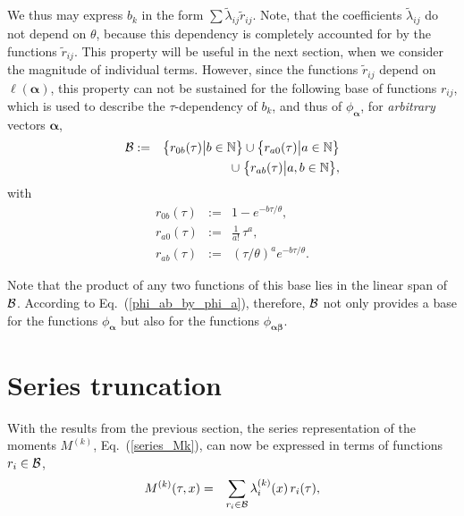 \documentclass[aps,twocolumn,superscriptaddress,showpacs,showkeys]{revtex4}
\newcommand{\vecalpha}{{\boldsymbol{\alpha}}}
\newcommand{\vecbeta}{{\boldsymbol{\beta}}}
\begin{document}
\noindent We thus may express $b_k$ in the form $\sum\tilde \lambda_{ij}\tilde r_{ij}$. Note, that the coefficients
$\tilde \lambda_{ij}$ do not depend on $\theta$, because this dependency is completely accounted for
by the functions $\tilde r_{ij}$. This property will be useful in the next section, when we consider the magnitude of
individual terms.
However, since the functions $\tilde r_{ij}$ depend on $\ell(\vecalpha)$, this property can not be sustained for
the following base of functions $r_{ij}$, which is used to describe the $\tau$-dependency of $b_k$, and thus of
$\phi_\vecalpha$, for {\em arbitrary} vectors $\vecalpha$,
%
\begin{eqnarray}
{\cal B} &:=& \big\{r_{0b}(\tau)\big|b\in\mathbb{N}\big\}\cup
              \big\{r_{a0}(\tau)\big|a\in\mathbb{N}\big\}\cr
         && \cup\; \big\{r_{ab}(\tau)\big|a,b\in\mathbb{N}\big\},
\end{eqnarray}
\noindent with
%
\begin{subequations}\label{def_r_ab}
\begin{eqnarray}
r_{0b}(\tau) &:=& 1-e^{-b\tau/\theta},\\
r_{a0}(\tau) &:=& \frac{1}{a!}\,\tau^a,\\
r_{ab}(\tau) &:=& \left(\tau/\theta\right)^a e^{-b\tau/\theta}.
\end{eqnarray}
\end{subequations}

\noindent Note that the product of any two functions of this base lies in the linear span of $\cal B$. According
to Eq.~(\ref{phi_ab_by_phi_a}), therefore, $\cal B$ not only provides a base for the functions $\phi_\vecalpha$ but also
for the functions $\phi_{\vecalpha\vecbeta}$.

\section{Series truncation}
\label{sec_approximate}

\noindent With the results from the previous section, the series representation of the moments $M^{(k)}$,
Eq.~(\ref{series_Mk}), can now be expressed in terms of functions $r_i\in{\cal B}$,
%
\begin{eqnarray}\label{Mk_lambda_r}
M^{(k)}(\tau,x) &=& \sum_{r_i\in{\cal B}}\lambda^{(k)}_i(x)\,r_i(\tau),
\end{eqnarray}
\end{document}
